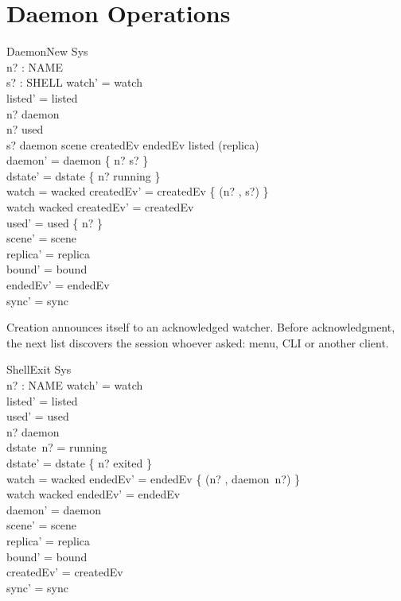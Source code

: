 \documentclass[a4paper,10pt,fleqn]{article}
\begin{document}
\section{Daemon Operations}

\begin{schema}{DaemonNew}
  \Delta Sys \\
  n? : NAME \\
  s? : SHELL
\where
  watch' = watch \\
  listed' = listed \\
  n? \notin \dom daemon \\
  n? \notin used \\
  s? \notin \ran daemon \cup \ran scene \cup \ran createdEv \cup
    \ran endedEv \cup \ran listed \cup \ran (\dom replica) \\
  daemon' = daemon \cup \{ n? \mapsto s? \} \\
  dstate' = dstate \cup \{ n? \mapsto running \} \\
  watch = wacked \implies createdEv' = createdEv \cup \{ (n? , s?) \} \\
  watch \neq wacked \implies createdEv' = createdEv \\
  used' = used \cup \{ n? \} \\
  scene' = scene \\
  replica' = replica \\
  bound' = bound \\
  endedEv' = endedEv \\
  sync' = sync
\end{schema}

Creation announces itself to an acknowledged watcher. Before acknowledgment,
the next list discovers the session whoever asked: menu, CLI or another client.

\begin{schema}{ShellExit}
  \Delta Sys \\
  n? : NAME
\where
  watch' = watch \\
  listed' = listed \\
  used' = used \\
  n? \in \dom daemon \\
  dstate~n? = running \\
  dstate' = dstate \oplus \{ n? \mapsto exited \} \\
  watch = wacked \implies endedEv' = endedEv \cup \{ (n? , daemon~n?) \} \\
  watch \neq wacked \implies endedEv' = endedEv \\
  daemon' = daemon \\
  scene' = scene \\
  replica' = replica \\
  bound' = bound \\
  createdEv' = createdEv \\
  sync' = sync
\end{schema}
\end{document}
